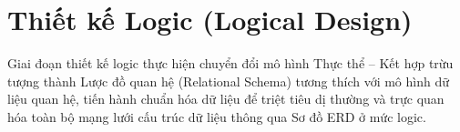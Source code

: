 \chapter{Thiết kế Logic (Logical Design)}
\label{chap:chuong2_logic}

Giai đoạn thiết kế logic thực hiện chuyển đổi mô hình Thực thể -- Kết hợp trừu tượng thành Lược đồ quan hệ (Relational Schema) tương thích với mô hình dữ liệu quan hệ, tiến hành chuẩn hóa dữ liệu để triệt tiêu dị thường và trực quan hóa toàn bộ mạng lưới cấu trúc dữ liệu thông qua Sơ đồ ERD ở mức logic.





